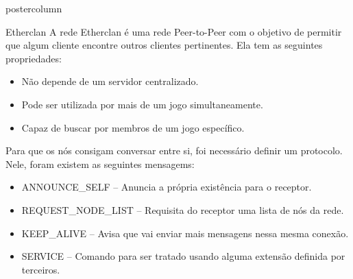\documentclass[final]{beamer}
\newlength{\columnheight}
\begin{document}
\begin{frame}
\begin{columns}
    \begin{column}{.5\textwidth}
      \begin{beamercolorbox}[center,wd=\textwidth]{postercolumn}
        \begin{minipage}[T]{.95\textwidth} %
          \parbox[t][\columnheight]{\textwidth}{ %
            
            \vspace*{0.8cm}
            
            \begin{block}{Etherclan}
                A rede Etherclan é uma rede Peer-to-Peer com o objetivo de permitir que algum cliente
                encontre outros clientes
                pertinentes. Ela tem as seguintes propriedades:
                
                \begin{itemize}
                  \item Não depende de um servidor centralizado.
                  \item Pode ser utilizada por mais de um jogo simultaneamente.
                  \item Capaz de buscar por membros de um jogo específico.
                \end{itemize}
                
                \vspace*{0.5cm}
                Para que os nós consigam conversar entre si, foi necessário definir um protocolo. 
                Nele, foram existem as seguintes mensagems:
                \begin{itemize}
                  \item ANNOUNCE\_SELF -- Anuncia a própria existência para o receptor.
                  \item REQUEST\_NODE\_LIST -- Requisita do receptor uma lista de nós da rede.
                  \item KEEP\_ALIVE -- Avisa que vai enviar mais mensagens nessa mesma conexão.
                  \item SERVICE -- Comando para ser tratado usando alguma extensão definida por terceiros.
                \end{itemize}
                

\end{block}}
\end{minipage}
\end{beamercolorbox}
\end{column}
\end{columns}
\end{frame}
\end{document}
